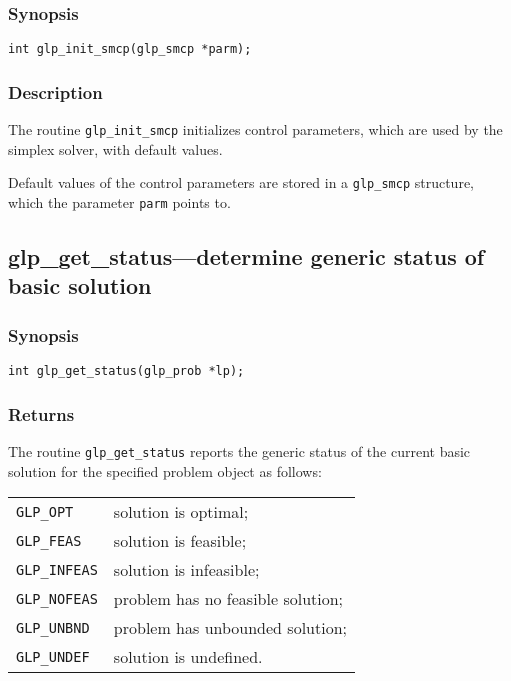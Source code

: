 \subsubsection*{Synopsis}

\begin{verbatim}
int glp_init_smcp(glp_smcp *parm);
\end{verbatim}

\subsubsection*{Description}

The routine \verb|glp_init_smcp| initializes control parameters, which
are used by the simplex solver, with default values.

Default values of the control parameters are stored in a \verb|glp_smcp|
structure, which the parameter \verb|parm| points to.

\subsection{glp\_get\_status---determine generic status of basic
solution}

\subsubsection*{Synopsis}

\begin{verbatim}
int glp_get_status(glp_prob *lp);
\end{verbatim}

\subsubsection*{Returns}

The routine \verb|glp_get_status| reports the generic status of the
current basic solution for the specified problem object as follows:

\begin{tabular}{@{}ll}
\verb|GLP_OPT|    & solution is optimal; \\
\verb|GLP_FEAS|   & solution is feasible; \\
\verb|GLP_INFEAS| & solution is infeasible; \\
\verb|GLP_NOFEAS| & problem has no feasible solution; \\
\verb|GLP_UNBND|  & problem has unbounded solution; \\
\verb|GLP_UNDEF|  & solution is undefined. \\
\end{tabular}

